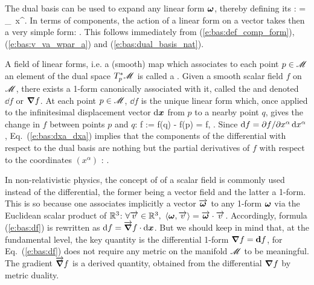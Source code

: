 The dual basis can be used to expand any linear form $\bm{\omega}$, thereby defining its
:
\be \label{e:bas:def_comp_form}
  \w{\omega} = \omega_\alpha \, \dd x^\alpha .
\ee
In terms of components, the action of a linear form on a vector takes then a very simple form:
\be
  .
\ee
This follows immediately from (\ref{e:bas:def_comp_form}),
(\ref{e:bas:v_va_wpar_a}) and (\ref{e:bas:dual_basis_nat}).

A field of linear forms, i.e. a (smooth) map which associates to each point $p\in\mathscr{M}$
an element of the dual space $T_p^*\mathscr{M}$ is called a .
Given a smooth scalar field $f$ on $\mathscr{M}$, there exists a 1-form canonically associated with it, called
the  and denoted $\dd f$ or $\bm{\nabla} f$.
At each point $p\in\mathscr{M}$, $\dd f$ is the unique linear form which, once
applied to the infinitesimal displacement vector $\mathrm{d}\bm{x}$ from $p$ to a
nearby point $q$, gives the change in $f$ between points $p$ and $q$:
\be \label{e:bas:df}
  \D f := f(q) - f(p) = \langle \dd f, \D{} \rangle .
\ee
Since $\mathrm{d} f = {\partial f}/{\partial x^\alpha} \, \mathrm{d} x^\alpha$, Eq.~(\ref{e:bas:dxa_dxa}) implies that the components of the differential with respect to the dual basis are nothing but the partial derivatives of $f$ with respect to the coordinates $(x^\alpha)$ :
\be \label{e:bas:grad_f_der_f}
   .
\ee

\begin{remark}
In non-relativistic physics, the concept of 
of a scalar field is commonly used instead of the
differential, the former being a vector field and the latter a 1-form.
This is so because one associates implicitly a vector
$\overrightarrow{\bm{\omega}}$ to any 1-form $\bm{\omega}$ via the Euclidean scalar product
of $\mathbb{R}^3$: $\forall \overrightarrow{v}\in \mathbb{R}^3,\ \langle \bm{\omega},\overrightarrow{v}\rangle = \overrightarrow{\bm{\omega}}\cdot\overrightarrow{v}$.
Accordingly, formula (\ref{e:bas:df}) is rewritten as
$\mathrm{d} f = \overrightarrow{\bm{\nabla}} f \cdot \mathrm{d}\bm{x}$. But we should keep in mind
that, at the fundamental level, the key quantity is the differential 1-form
$\bm{\nabla} f = \mathbf{d} f$, for Eq.~(\ref{e:bas:df}) does not require any metric on the
manifold $\mathscr{M}$ to be
meaningful. The gradient $\overrightarrow{\bm{\nabla}} f$ is a derived quantity, obtained
from the differential $\bm{\nabla} f$ by metric duality.
\end{remark}

